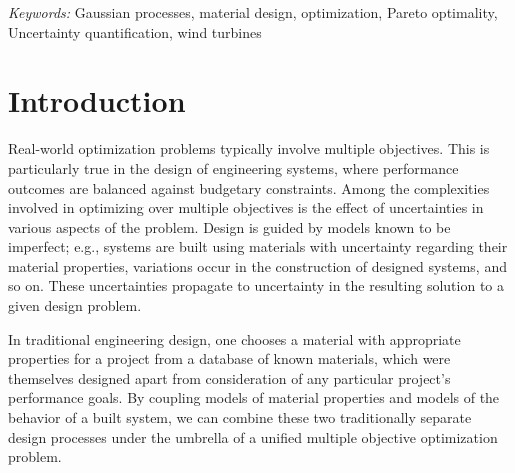 \documentclass[12pt]{article}
\begin{document}
\noindent%
{\it Keywords:}  Gaussian processes, material design, optimization, Pareto optimality, Uncertainty quantification, wind turbines
\vfill

\newpage
{} %
\section{Introduction}
\label{introduction}

Real-world optimization problems typically involve multiple objectives. 
%
This is particularly true in the design of engineering systems, where performance outcomes are balanced against budgetary constraints. 
%
Among the complexities involved in optimizing over multiple objectives is the effect of uncertainties in various aspects of the problem. 
%
Design is guided by models known to be imperfect; e.g., systems are built using materials with uncertainty regarding their material properties, variations occur in the construction of designed systems, and so on. 
%
These uncertainties propagate to uncertainty in the resulting solution to a given design problem. 

In traditional engineering design, one chooses a material with appropriate properties for a project from a database of known materials, which were themselves designed apart from consideration of any particular project's performance goals. 
%
By coupling models of material properties and models of the behavior of a built system, we can combine these two traditionally separate design processes under the umbrella of a unified multiple objective optimization problem.
\end{document}
